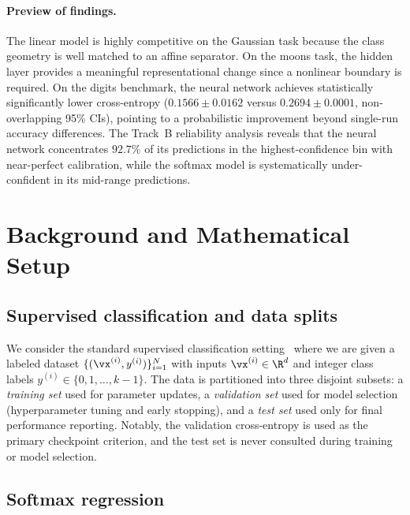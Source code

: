 \documentclass[sigconf,screen,nonacm]{acmart}
\begin{document}
\paragraph{Preview of findings.}
The linear model is highly competitive on the Gaussian task because the class geometry is well matched to an affine separator. On the moons task, the hidden layer provides a meaningful representational change since a nonlinear boundary is required. On the digits benchmark, the neural network achieves statistically significantly lower cross-entropy ($0.1566 \pm 0.0162$ versus $0.2694 \pm 0.0001$, non-overlapping 95\% CIs), pointing to a probabilistic improvement beyond single-run accuracy differences. The Track~B reliability analysis reveals that the neural network concentrates $92.7\%$ of its predictions in the highest-confidence bin with near-perfect calibration, while the softmax model is systematically under-confident in its mid-range predictions.

\section{Background and Mathematical Setup}

\subsection{Supervised classification and data splits}
\label{sec:supervised-classification}

We consider the standard supervised classification setting~\cite{murphy2022pml} where we are given a labeled dataset $\{(\vx^{(i)}, y^{(i)})\}_{i=1}^{N}$ with inputs $\vx^{(i)} \in \R^d$ and integer class labels $y^{(i)} \in \{0, 1, \ldots, k-1\}$. The data is partitioned into three disjoint subsets: a \emph{training set} used for parameter updates, a \emph{validation set} used for model selection (hyperparameter tuning and early stopping), and a \emph{test set} used only for final performance reporting. Notably, the validation cross-entropy is used as the primary checkpoint criterion, and the test set is never consulted during training or model selection.

\subsection{Softmax regression}
\label{sec:softmax-regression}
\end{document}
